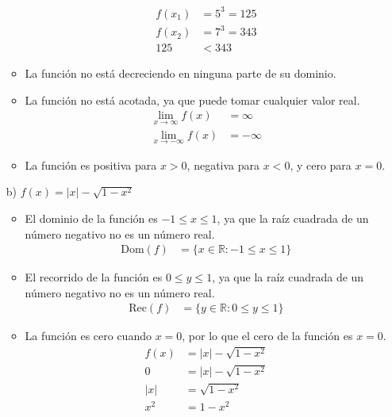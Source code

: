 \documentclass{templateNote}
\begin{document}
\begin{itemize}
\begin{itemize}
                \begin{align*}
                    f(x_1) &= 5^3 = 125 \\
                    f(x_2) &= 7^3 = 343 \\
                    125 &< 343
                \end{align*}
            \item {} La función no está decreciendo en ninguna parte de su dominio.
            \item {} La función no está acotada, ya que puede tomar cualquier valor real.
                \begin{align*}
                    \lim_{x \to \infty} f(x) &= \infty \\
                    \lim_{x \to -\infty} f(x) &= -\infty
                \end{align*}
            \item {} La función es positiva para $x > 0$, negativa para $x < 0$, y cero para $x = 0$.
        \end{itemize}
    \item[b)] $f(x) = |x| - \sqrt{1 - x^2}$
        \begin{itemize}
            \item {} El dominio de la función es $-1 \leq x \leq 1$, ya que la raíz cuadrada de un número negativo no es un número real.
                \begin{align*}
                    \text{Dom}(f) &= \{x \in \mathbb{R} : -1 \leq x \leq 1\}
                \end{align*}
            \item {} El recorrido de la función es $0 \leq y \leq 1$, ya que la raíz cuadrada de un número negativo no es un número real.
                \begin{align*}
                    \text{Rec}(f) &= \{y \in \mathbb{R} : 0 \leq y \leq 1\}
                \end{align*}
            \item {} La función es cero cuando $x = 0$, por lo que el cero de la función es $x = 0$.
                \begin{align*}
                    f(x) &= |x| - \sqrt{1 - x^2} \\
                    0 &= |x| - \sqrt{1 - x^2} \\
                    |x| &= \sqrt{1 - x^2} \\
                    x^2 &= 1 - x^2 \\

\end{align*}
\end{itemize}
\end{itemize}
\end{document}
